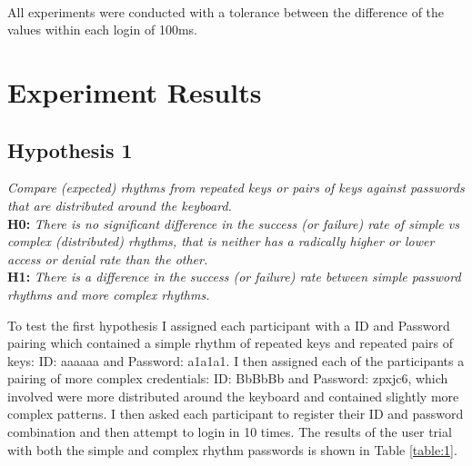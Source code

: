 \documentclass{article}
\begin{document}
\paragraph{}
All experiments were conducted with a tolerance between the difference of the values within each login of 100ms. 

\section{Experiment Results}

\subsection{Hypothesis 1}
\begin{center}
\textit{Compare	(expected)	rhythms	from	repeated	keys	or	pairs	of	keys	
against	passwords that are	distributed	around	the	keyboard.} \newline \\

\textbf{H0:} \textit{There	is	no significant	difference	in	the	success	(or	failure)	rate	of	simple	vs	complex	(distributed)	rhythms,	that	is	neither has	a	radically	higher	or	lower	access	or	denial	rate	than	the	other.} \newline \\

\textbf{H1:} \textit{There is a difference in the	success	(or	failure)	rate	between	simple password rhythms	and	more complex rhythms.}
\end{center}

To test the first hypothesis I assigned each participant with a ID and Password pairing which contained a simple rhythm of repeated keys and repeated pairs of keys: ID: aaaaaa and Password: a1a1a1. I then assigned each of the participants a pairing of more complex credentials: ID: BbBbBb and Password: zpxjc6, which involved were more distributed around the keyboard and contained slightly more complex patterns. I then asked each participant to register their ID and password combination and then attempt to login in 10 times. The results of the user trial with both the simple and complex rhythm passwords is shown in Table \ref{table:1}. 
\end{document}
